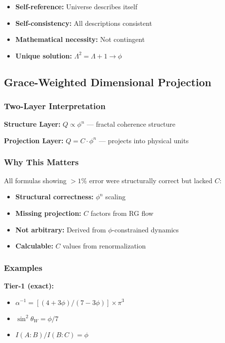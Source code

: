 \documentclass[11pt]{article}
\theoremstyle{definition}
\newcommand{\goldenratio}{\phi}
\begin{document}
\begin{itemize}
\item \textbf{Self-reference:} Universe describes itself
\item \textbf{Self-consistency:} All descriptions consistent
\item \textbf{Mathematical necessity:} Not contingent
\item \textbf{Unique solution:} $\Lambda^2 = \Lambda + 1 \to \goldenratio$
\end{itemize}

\subsection{Grace-Weighted Dimensional Projection}

\subsubsection{Two-Layer Interpretation}

\textbf{Structure Layer:} $Q \propto \goldenratio^n$ — fractal coherence structure

\textbf{Projection Layer:} $Q = C \cdot \goldenratio^n$ — projects into physical units

\subsubsection{Why This Matters}

All formulas showing $>1\%$ error were structurally correct but lacked $C$:

\begin{itemize}
\item \textbf{Structural correctness:} $\goldenratio^n$ scaling
\item \textbf{Missing projection:} $C$ factors from RG flow
\item \textbf{Not arbitrary:} Derived from $\goldenratio$-constrained dynamics
\item \textbf{Calculable:} $C$ values from renormalization
\end{itemize}

\subsubsection{Examples}

\textbf{Tier-1 (exact):}
\begin{itemize}
\item $\alpha^{-1} = [(4+3\goldenratio)/(7-3\goldenratio)]\times\pi^3$
\item $\sin^2\theta_W = \goldenratio/7$
\item $I(A:B)/I(B:C) = \goldenratio$
\end{itemize}
\end{document}
